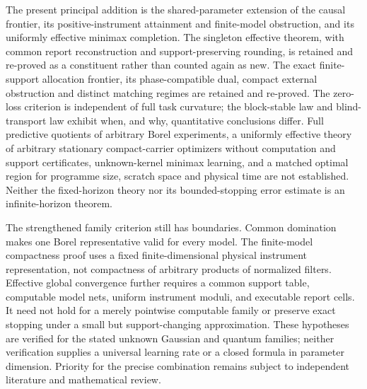 The present principal addition is the shared-parameter extension of the causal frontier, its positive-instrument attainment and finite-model obstruction, and its uniformly effective minimax completion. The singleton effective theorem, with common report reconstruction and support-preserving rounding, is retained and re-proved as a constituent rather than counted again as new. The exact finite-support allocation frontier, its phase-compatible dual, compact external obstruction and distinct matching regimes are retained and re-proved. The zero-loss criterion is independent of full task curvature; the block-stable law and blind-transport law exhibit when, and why, quantitative conclusions differ. Full predictive quotients of arbitrary Borel experiments, a uniformly effective theory of arbitrary stationary compact-carrier optimizers without computation and support certificates, unknown-kernel minimax learning, and a matched optimal region for programme size, scratch space and physical time are not established. Neither the fixed-horizon theory nor its bounded-stopping error estimate is an infinite-horizon theorem.

The strengthened family criterion still has boundaries. Common domination makes one Borel representative valid for every model. The finite-model compactness proof uses a fixed finite-dimensional physical instrument representation, not compactness of arbitrary products of normalized filters. Effective global convergence further requires a common support table, computable model nets, uniform instrument moduli, and executable report cells. It need not hold for a merely pointwise computable family or preserve exact stopping under a small but support-changing approximation. These hypotheses are verified for the stated unknown Gaussian and quantum families; neither verification supplies a universal learning rate or a closed formula in parameter dimension. Priority for the precise combination remains subject to independent literature and mathematical review.
